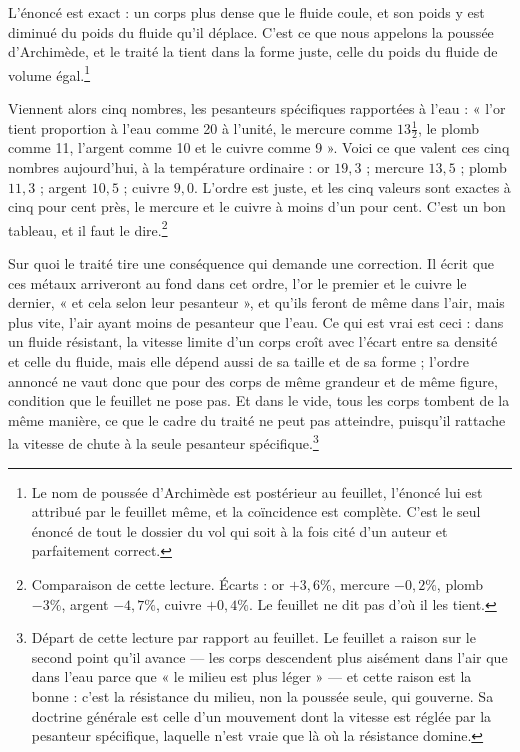 \documentclass[11pt,a4paper]{article}
\begin{document}
L'énoncé est exact : un corps plus dense que le fluide coule, et son poids y est
diminué du poids du fluide qu'il déplace. C'est ce que nous appelons la poussée
d'Archimède, et le traité la tient dans la forme juste, celle du poids du fluide
de volume égal.\footnote{Le nom de poussée d'Archimède est postérieur au
feuillet, l'énoncé lui est attribué par le feuillet même, et la coïncidence est
complète. C'est le seul énoncé de tout le dossier du vol qui soit à la fois cité
d'un auteur et parfaitement correct.}

Viennent alors cinq nombres, les pesanteurs spécifiques rapportées à l'eau :
« l'or tient proportion à l'eau comme 20 à l'unité, le mercure comme
$13\tfrac12$, le plomb comme 11, l'argent comme 10 et le cuivre comme 9 ». Voici
ce que valent ces cinq nombres aujourd'hui, à la température ordinaire : or
$19{,}3$ ; mercure $13{,}5$ ; plomb $11{,}3$ ; argent $10{,}5$ ; cuivre $9{,}0$.
L'ordre est juste, et les cinq valeurs sont exactes à cinq pour cent près, le
mercure et le cuivre à moins d'un pour cent. C'est un bon tableau, et il faut le
dire.\footnote{Comparaison de cette lecture. Écarts : or $+3{,}6\%$, mercure
$-0{,}2\%$, plomb $-3\%$, argent $-4{,}7\%$, cuivre $+0{,}4\%$. Le feuillet ne
dit pas d'où il les tient.}

Sur quoi le traité tire une conséquence qui demande une correction. Il écrit que
ces métaux arriveront au fond dans cet ordre, l'or le premier et le cuivre le
dernier, « et cela selon leur pesanteur », et qu'ils feront de même dans l'air,
mais plus vite, l'air ayant moins de pesanteur que l'eau. Ce qui est vrai est
ceci : dans un fluide résistant, la vitesse limite d'un corps croît avec l'écart
entre sa densité et celle du fluide, mais elle dépend aussi de sa taille et de
sa forme ; l'ordre annoncé ne vaut donc que pour des corps de même grandeur et
de même figure, condition que le feuillet ne pose pas. Et dans le vide, tous les
corps tombent de la même manière, ce que le cadre du traité ne peut pas
atteindre, puisqu'il rattache la vitesse de chute à la seule pesanteur
spécifique.\footnote{Départ de cette lecture par rapport au feuillet. Le feuillet
a raison sur le second point qu'il avance — les corps descendent plus aisément
dans l'air que dans l'eau parce que « le milieu est plus léger » — et cette
raison est la bonne : c'est la résistance du milieu, non la poussée seule, qui
gouverne. Sa doctrine générale est celle d'un mouvement dont la vitesse est
réglée par la pesanteur spécifique, laquelle n'est vraie que là où la résistance
domine.}
\end{document}
